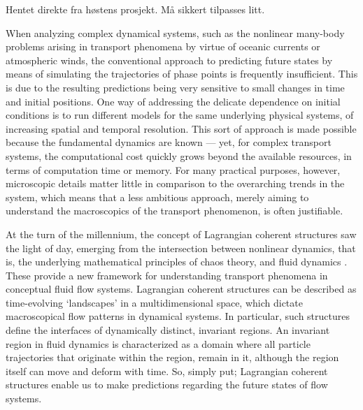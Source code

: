 \begin{framed}
Hentet direkte fra høstens prosjekt. Må sikkert tilpasses litt.
\end{framed}
When analyzing complex dynamical systems, such as the nonlinear many-body
problems arising in transport phenomena by virtue of oceanic currents or
atmospheric winds, the conventional approach to predicting future states
by means of simulating the trajectories of phase points is frequently
insufficient. This is due to the resulting predictions being very sensitive to
small changes in time and initial positions. One way of addressing the delicate
dependence on initial conditions is to run different models for the same
underlying physical systems, of increasing spatial and temporal resolution. This
sort of approach is made possible because the fundamental dynamics are known ---
yet, for complex transport systems, the computational cost quickly grows beyond
the available resources, in terms of computation time or memory. For many
practical purposes, however, microscopic details matter little in comparison to
the overarching trends in the system, which means that a less ambitious
approach, merely aiming to understand the macroscopics of the transport
phenomenon, is often justifiable.

At the turn of the millennium, the concept of Lagrangian coherent structures
saw the light of day, emerging from the intersection between nonlinear dynamics,
that is, the underlying mathematical principles of chaos theory, and fluid
dynamics \parencite{haller2000lagrangian}. These provide a new framework for
understanding transport phenomena in conceptual fluid flow systems. Lagrangian
coherent structures can be described as time-evolving `landscapes' in a
multidimensional space, which dictate macroscopical flow patterns in dynamical
systems. In particular, such structures define the interfaces of dynamically
distinct, invariant regions. An invariant region in fluid dynamics is
characterized as a domain where all particle trajectories that originate within
the region, remain in it, although the region itself can move and deform with
time. So, simply put; Lagrangian coherent structures enable us to make
predictions regarding the future states of flow systems.

